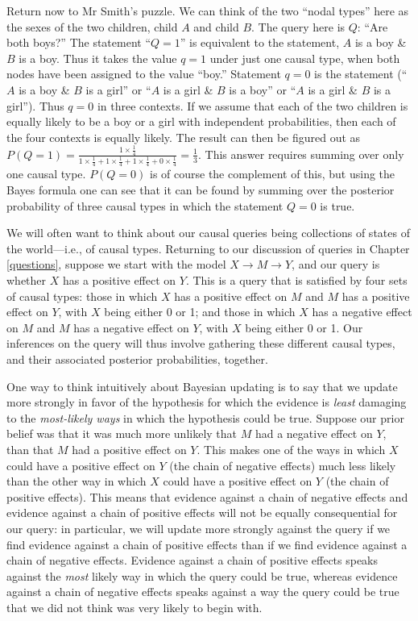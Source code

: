 \documentclass[
  12pt,
]{book}
\begin{document}
Return now to Mr Smith's puzzle. We can think of the two ``nodal types'' here as the sexes of the two children, child \(A\) and child \(B\). The query here is \(Q\): ``Are both boys?'' The statement ``\(Q=1\)'' is equivalent to the statement, \(A\) is a boy \& \(B\) is a boy. Thus it takes the value \(q=1\) under just one causal type, when both nodes have been assigned to the value ``boy.'' Statement \(q=0\) is the statement (``\(A\) is a boy \& \(B\) is a girl'' or ``\(A\) is a girl \& \(B\) is a boy'' or ``\(A\) is a girl \& \(B\) is a girl''). Thus \(q=0\) in three contexts. If we assume that each of the two children is equally likely to be a boy or a girl with independent probabilities, then each of the four contexts is equally likely.
The result can then be figured out as \(P(Q=1) = \frac{1\times \frac{1}{4}}{1\times \frac{1}{4} + 1\times \frac{1}{4}+1\times \frac{1}{4}+0\times \frac{1}{4}} = \frac{1}{3}\). This answer requires summing over only one causal type. \(P(Q=0)\) is of course the complement of this, but using the Bayes formula one can see that it can be found by summing over the posterior probability of three causal types in which the statement \(Q=0\) is true.

We will often want to think about our causal queries being collections of states of the world---i.e., of causal types. Returning to our discussion of queries in Chapter \ref{questions}, suppose we start with the model \(X \rightarrow M \rightarrow Y\), and our query is whether \(X\) has a positive effect on \(Y\). This is a query that is satisfied by four sets of causal types: those in which \(X\) has a positive effect on \(M\) and \(M\) has a positive effect on \(Y\), with \(X\) being either 0 or 1; and those in which \(X\) has a negative effect on \(M\) and \(M\) has a negative effect on \(Y\), with \(X\) being either 0 or 1. Our inferences on the query will thus involve gathering these different causal types, and their associated posterior probabilities, together.

One way to think intuitively about Bayesian updating is to say that we update more strongly in favor of the hypothesis for which the evidence is \emph{least} damaging to the \emph{most-likely ways} in which the hypothesis could be true. Suppose our prior belief was that it was much more unlikely that \(M\) had a negative effect on \(Y\), than that \(M\) had a positive effect on \(Y\). This makes one of the ways in which \(X\) could have a positive effect on \(Y\) (the chain of negative effects) much less likely than the other way in which \(X\) could have a positive effect on \(Y\) (the chain of positive effects). This means that evidence against a chain of negative effects and evidence against a chain of positive effects will not be equally consequential for our query: in particular, we will update more strongly against the query if we find evidence against a chain of positive effects than if we find evidence against a chain of negative effects. Evidence against a chain of positive effects speaks against the \emph{most} likely way in which the query could be true, whereas evidence against a chain of negative effects speaks against a way the query could be true that we did not think was very likely to begin with.
\end{document}
